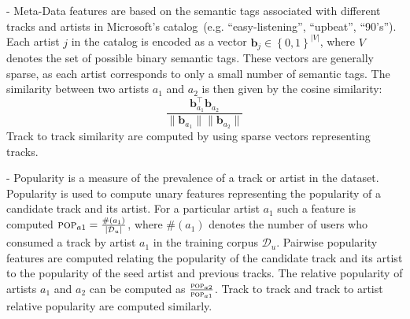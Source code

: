  -
Meta-Data features are based on the semantic tags associated with different tracks and artists in Microsoft's catalog~(e.g. ``easy-listening'', ``upbeat'', ``90's''). Each artist $j$ in the catalog is  encoded as a vector $\mathbf{b}_j \in \left\{0,1\right\}^{|V|}$, where $V$ denotes the set of  possible binary semantic tags. These vectors are generally sparse, as each artist corresponds to only a small number of semantic tags.  The similarity between two artists $a_1$ and $a_2$ is then given by the cosine similarity: 
\begin{equation}\frac{\mathbf{b}_{a_1}^\top\mathbf{b}_{a_2}}{\parallel\mathbf{b}_{a_1}\parallel\parallel\mathbf{b}_{a_2}\parallel}
\end{equation}
Track to track similarity are computed by using sparse vectors representing tracks.

 -
Popularity is a measure of the prevalence of a track or artist in the dataset.
Popularity is used to compute unary features representing the popularity of a candidate track and its artist. For a particular artist $a_1$ such a feature is computed $\textsc{pop}_{a1}=\frac{\#\left(a_1\right)}{|\mathcal{D}_u|}$, where $\#\left(a_1\right)$ denotes the number of users who consumed a track by artist $a_1$  in the training corpus $\mathcal{D}_u$. Pairwise popularity features are computed relating the popularity of the candidate track and its artist to the popularity of the seed artist and previous tracks. The relative popularity of artists $a_1$ and $a_2$ can be computed as $\frac{\textsc{pop}_{a2}}{\textsc{pop}_{a1}}$. Track to track and track to artist relative popularity are computed similarly.








